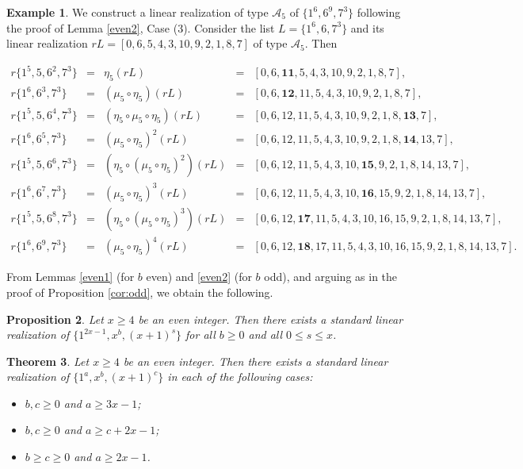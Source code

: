 \documentclass{amsart}
\newtheorem{prop}{Proposition}[section]
\newtheorem{thm}[prop]{Theorem}
\theoremstyle{definition}
\newtheorem{ex}[prop]{Example}
\numberwithin{equation}{section}
\def\A{\mathcal{A}}
\begin{document}
\begin{ex}
We construct a  linear realization of  type $\A_5$ of $\{1^{6},6^9,7^3\}$
following the proof of Lemma \ref{even2}, Case (3).
Consider the list $L=\{1^6,6,7^3\}$ and its linear realization
$rL=[0,6,5,4,3,10,9,2,1,8,7]$  of type $\A_5$. Then

\begin{footnotesize}
$$\begin{array}{rcccl}
r\{1^5,5,6^2,7^3\} & = & \eta_5(rL) & =& [0,6,\bm{11},5,4,3,10,9,2,1,8,7], \\
r\{1^6,6^3,7^3\} & = & (\mu_5\circ\eta_5)(rL) & =& [0,6,\bm{12},11,5,4,3,10,9,2,1,8,7], \\
r\{1^5,5,6^4,7^3\} & = & (\eta_5\circ \mu_5\circ \eta_5)(rL) & =&  [0,6,12,11,5,4,3,10,9,2,1,8,\bm{13},7], \\
r\{1^6,6^5,7^3\} & = & (\mu_5\circ\eta_5)^2(rL) & =& [0,6,12,11,5,4,3,10,9,2,1,8,\bm{14},13,7], \\
r\{1^5,5,6^6,7^3\} & = & (\eta_5\circ(\mu_5\circ\eta_5)^2)(rL) & =& [0,6,12,11,5,4,3,10,\bm{15},9,2,1,8,14,13,7], \\
r\{1^6,6^7,7^3\} & = & (\mu_5\circ\eta_5)^3(rL) & =& [0,6,12,11,5,4,3,10,\bm{16},15,9,2,1,8,14,13,7],\\
r\{1^5,5,6^8,7^3\} & = & (\eta_5\circ(\mu_5\circ\eta_5)^3)(rL) & =& [0,6,12,\bm{17},11,5,4,3,10,16,15,9,2,1,8,14,13,7], \\
r\{1^6,6^9,7^3\} & = & (\mu_5\circ\eta_5)^4(rL) & =& [0,6,12,\bm{18},17,11,5,4,3,10,16,15,9,2,1,8,14,13,7].
\end{array}$$
\end{footnotesize}
\end{ex}

From Lemmas \ref{even1} (for $b$ even) and \ref{even2} (for $b$ odd), and arguing as in the proof of
Proposition \ref{cor:odd},  we obtain the following.

\begin{prop}\label{cor:even}
Let $x\geq 4$ be an even integer. Then there exists a standard linear realization of $\{1^{2x-1}, x^b, (x+1)^s\}$
for all $b\geq 0$ and all $0\leq s\leq x$.
\end{prop}


\begin{thm}\label{prop:even}
Let $x\geq 4$ be an even integer. Then there exists a standard linear realization of $\{1^a,x^b,(x+1)^c\}$
in each of the following cases:
\begin{itemize}
\item[(1)] $b,c\geq 0$ and  $a\geq 3x-1$;
\item[(2)] $b,c\geq 0$ and  $a\geq c+2x-1$;
\item[(3)] $b\geq c\geq 0$ and $a\geq 2x-1$.
\end{itemize}
\end{thm}
\end{document}
